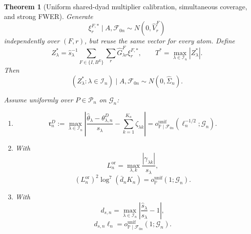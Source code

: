 \documentclass[11pt]{article}
\newtheorem{theorem}{Theorem}[section]
\theoremstyle{definition}
\newcommand{\1}{\mathbf 1}\newcommand{\op}{\operatorname}
\begin{document}
\begin{theorem}[Uniform shared-dyad multiplier calibration,\label{thm:fwer}
simultaneous coverage, and strong FWER]
Generate
\[
\xi_r^{F,*}\mid A,\mathcal F_{0n}
\sim N(0,\widehat V_r^F)
\]
independently over $(F,r)$, but reuse the same vector for every atom.
Define
\begin{equation}
Z_\lambda^*
=
\widehat s_\lambda^{-1}
\sum_{F\in\{I,B^E\}}\sum_r
\widehat G_{\lambda r}^F\xi_r^{F,*},
\qquad
T^*
=
\max_{\lambda\in\mathcal I_n}|Z_\lambda^*|.
\label{eq:shared-multiplier}
\end{equation}
Then
\begin{equation}
(Z_\lambda^*:\lambda\in\mathcal I_n)
\mid A,\mathcal F_{0n}
\sim N(0,\widehat\Sigma_n).
\label{eq:exact-bootstrap-Gaussian-law}
\end{equation}

Assume uniformly over $P\in\mathcal P_n$ on $\mathcal G_n$:

\begin{enumerate}
\item[(i)]
\begin{equation}
\mathfrak r_n^D
:=
\max_{\lambda\in\mathcal I_n}
\left|
\frac{\widehat\theta_\lambda-\theta_{\lambda,n}^D}{s_\lambda}
-
\sum_{k=1}^{K_n}\zeta_{\lambda k}
\right|
=
o_{\mathbb P\mid\mathcal F_{0n}}^{\mathrm{unif}}
(\ell_n^{-1/2};\mathcal G_n).
\label{eq:assumed-linearization}
\end{equation}

\item[(ii)] With
\[
L_n^{\mathrm{or}}
=
\max_{\lambda,k}\frac{|\gamma_{\lambda k}|}{s_\lambda},
\]
\begin{equation}
(L_n^{\mathrm{or}})^2\log^7(\bar d_nK_n)
=
o_{\mathbb P}^{\mathrm{unif}}(1;\mathcal G_n).
\label{eq:oracle-leverage-rate}
\end{equation}

\item[(iii)] With
\[
d_{s,n}
=
\max_{\lambda\in\mathcal I_n}
\left|
\frac{\widehat s_\lambda}{s_\lambda}-1
\right|,
\]
\begin{equation}
d_{s,n}\ell_n
=
o_{\mathbb P\mid\mathcal F_{0n}}^{\mathrm{unif}}
(1;\mathcal G_n).
\label{eq:studentizer-rate}
\end{equation}


\end{enumerate}
\end{theorem}
\end{document}
